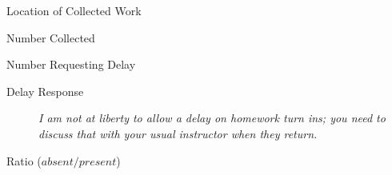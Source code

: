 \documentclass[10pt]{article}
\begin{document}
\begin{description}
    \item[Location of Collected Work] \uline{\hfill\null}
    \item[Number Collected] \uline{\hfill\null}
    \item[Number Requesting Delay] \uline{\hfill\null}
    \item[Delay Response] \textit{I am not at liberty to allow a delay on homework turn ins; you need to discuss that with your usual instructor when they return.}
    \item[Ratio \scriptsize{($absent/present$})] \uline{\hfill\null}
\end{description}




\end{document}
